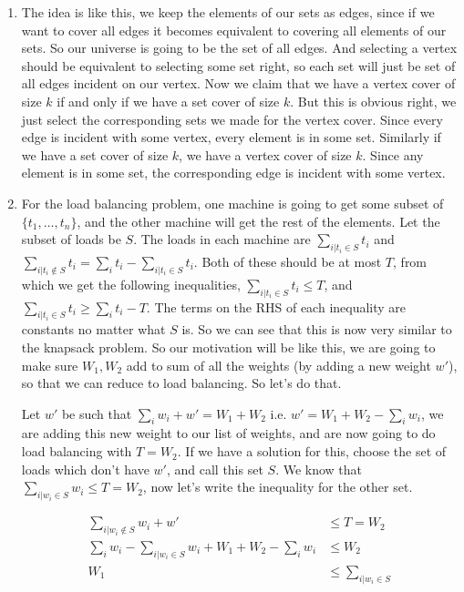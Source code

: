 \documentclass[12pt]{report}
\begin{document}
\begin{enumerate}[label=\textbf{\arabic*.}]
    \item The idea is like this, we keep the elements of our sets as edges, since if we want to cover all edges it becomes equivalent to
    covering all elements of our sets. So our universe is going to be the set of all edges.
    And selecting a vertex should be equivalent to selecting some set right, so each set will just be set of all edges incident on our vertex.
    Now we claim that we have a vertex cover of size $k$ if and only if we have a set cover of size $k$. But this is obvious right, we just 
    select the corresponding sets we made for the vertex cover. Since every edge is incident with some vertex, every element is in some set.
    Similarly if we have a set cover of size $k$, we have a vertex cover of size $k$. Since any element is in some set, the corresponding edge 
    is incident with some vertex.

    \item For the load balancing problem, one machine is going to get some subset of $\{t_1, \dots, t_n\}$, and the other machine will get
    the rest of the elements. Let the subset of loads be $S$. The loads in each machine are $\sum_{i|t_i \in S} t_i$ and 
    $\sum_{i|t_i \notin S} t_i = \sum_i t_i - \sum_{i|t_i \in S} t_i$. Both of these should be at most $T$, from which we get the following 
    inequalities, $\sum_{i|t_i \in S} t_i \leq T$, and $\sum_{i|t_i \in S} t_i \geq \sum_i t_i - T$. The terms on the RHS of each inequality are 
    constants no matter what $S$ is. So we can see that this is now very similar to the knapsack problem. So our motivation will be like this,
    we are going to make sure $W_1, W_2$ add to sum of all the weights (by adding a new weight $w'$), 
    so that we can reduce to load balancing. So let's do that.

    Let $w'$ be such that $\sum_i w_i + w' = W_1 + W_2$ i.e. $w' = W_1 + W_2 - \sum_i w_i$, we are adding this new weight to our list of weights,
    and are now going to do load balancing with $T = W_2$. If we have a solution for this, choose the set of loads which don't have $w'$, and 
    call this set $S$. We know that $\sum_{i|w_i \in S} w_i \leq T = W_2$, now let's write the inequality for the other set.

    \begin{align*}
        \sum_{i|w_i \notin S} w_i + w' &\leq T = W_2 \\
        \sum_i w_i - \sum_{i|w_i \in S} w_i + W_1 + W_2 - \sum_i w_i &\leq W_2 \\
        W_1 &\leq \sum_{i|w_i \in S} 
    \end{align*}


\end{enumerate}
\end{document}
